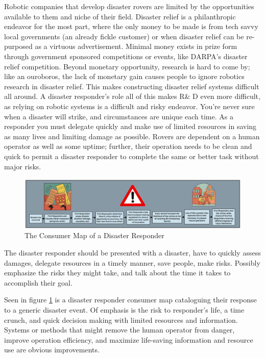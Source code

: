 \documentclass[a4paper, 10pt]{article}
\begin{document}
		Robotic companies that develop disaster rovers are limited by the opportunities available to them and niche of their field. Disaster relief is a philanthropic endeavor for the most part, where the only money to  be made is from tech savvy local governments (an already fickle customer) or when disaster relief can be re-purposed as a virtuous advertisement. Minimal money exists in prize form through government sponsored competitions or events, like DARPA's disaster relief competition. Beyond monetary opportunity, research is hard to come by; like an ouroboros, the lack of monetary gain causes people to ignore robotics research in disaster relief. This makes constructing disaster relief systems difficult all around. A disaster responder's role all of this makes R\& D even more difficult, as relying on robotic systems is a difficult and risky endeavor. You're never sure when a disaster will strike, and circumstances are unique each time. As a responder you must delegate quickly and make use of limited resources in saving as many lives and limiting damage as possible. Rovers are dependent on a human operator as well as some uptime; further, their operation needs to be clean and quick to permit a disaster responder to complete the same or better task without major risks.
		
		\begin{figure} [!h]
			\centering
			\includegraphics[scale=0.4]{Photos/Disaster Consumer Map}
			\caption{The Consumer Map of a Disaster Responder}
			\label{consumer_map_disaster}
		\end{figure}		
		
		The disaster responder should be presented with a disaster, have to quickly assess damages, delegate  resources in a timely manner, save people, make risks. Possibly emphasize the risks they might take, and talk about the time it takes to accomplish their goal. 
		
		Seen in figure \ref{consumer_map_disaster} is a disaster responder consumer map cataloguing their response to a generic disaster event. Of emphasis is the risk to responder's life, a time crunch, and quick decision making with limited resources and information. Systems or methods that might remove the human operator from danger, improve operation efficiency, and maximize life-saving information and resource use are obvious improvements.
		
\end{document}
